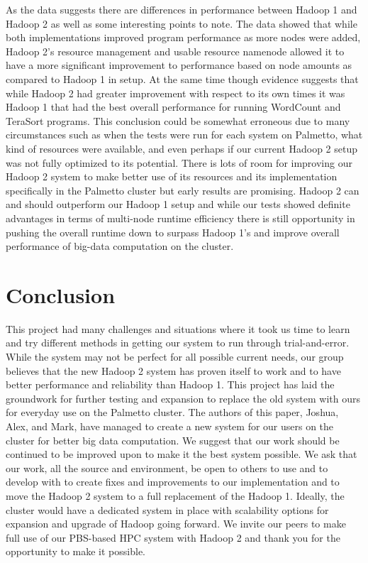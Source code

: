\documentclass[conference]{IEEEtran}
\begin{document}
						As the data suggests there are differences in performance between Hadoop 1 and Hadoop 2 as well as some interesting points to note. The data showed that while both implementations improved program performance as more nodes were added, Hadoop 2’s resource management and usable resource namenode allowed it to have a more significant improvement to performance based on node amounts as compared to Hadoop 1 in setup. At the same time though evidence suggests that while Hadoop 2 had greater improvement with respect to its own times it was Hadoop 1 that had the best overall performance for running WordCount and TeraSort programs. This conclusion could be somewhat erroneous due to many circumstances such as when the tests were run for each system on Palmetto, what kind of resources were available, and even perhaps if our current Hadoop 2 setup was not fully optimized to its potential. There is lots of room for improving our Hadoop 2 system to make better use of its resources and its implementation specifically in the Palmetto cluster but early results are promising. Hadoop 2 can and should outperform our Hadoop 1 setup and while our tests showed definite advantages in terms of multi-node runtime efficiency there is still opportunity in pushing the overall runtime down to surpass Hadoop 1’s and improve overall performance of big-data computation on the cluster.
							\section{Conclusion}
			This project had many challenges and situations where it took us time to learn and try different methods in getting our system to run through trial-and-error. While the system may not be perfect for all possible current needs, our group believes that the new Hadoop 2 system has proven itself to work and to have better performance and reliability than Hadoop 1. This project has laid the groundwork for further testing and expansion to replace the old system with ours for everyday use on the Palmetto cluster. The authors of this paper, Joshua, Alex, and Mark, have managed to create a new system for our users on the cluster for better big data computation. We suggest that our work should be continued to be improved upon to make it the best system possible. We ask that our work\cite{projectcode}, all the source and environment, be open to others to use and to develop with to create fixes and improvements to our implementation and to move the Hadoop 2 system to a full replacement of the Hadoop 1. Ideally, the cluster would have a dedicated system in place with scalability options for expansion and upgrade of Hadoop going forward. We invite our peers to make full use of our PBS-based HPC system with Hadoop 2 and thank you for the opportunity to make it possible.





\end{document}
